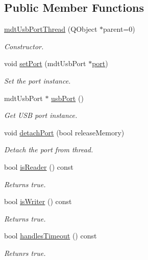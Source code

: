 \subsection*{Public Member Functions}
\begin{DoxyCompactItemize}
\item 
\hyperlink{classmdt_usb_port_thread_aaf4e5883224f05d80132b31a921ac899}{mdt\-Usb\-Port\-Thread} (Q\-Object $\ast$parent=0)
\begin{DoxyCompactList}\small\item\em Constructor. \end{DoxyCompactList}\item 
void \hyperlink{classmdt_usb_port_thread_a1661f362e2d772c1524f09daa6da3f15}{set\-Port} (mdt\-Usb\-Port $\ast$\hyperlink{classmdt_port_thread_a97bff8cf6aca37d8858cc4e5c9294cae}{port})
\begin{DoxyCompactList}\small\item\em Set the port instance. \end{DoxyCompactList}\item 
mdt\-Usb\-Port $\ast$ \hyperlink{classmdt_usb_port_thread_aaa8e1ce181489dbae57c81b42dc6ad62}{usb\-Port} ()
\begin{DoxyCompactList}\small\item\em Get U\-S\-B port instance. \end{DoxyCompactList}\item 
void \hyperlink{classmdt_usb_port_thread_a99070e7dba4bd7939b054cddbd66979f}{detach\-Port} (bool release\-Memory)
\begin{DoxyCompactList}\small\item\em Detach the port from thread. \end{DoxyCompactList}\item 
bool \hyperlink{classmdt_usb_port_thread_aed82b57c84745f1e2391750697db1022}{is\-Reader} () const 
\begin{DoxyCompactList}\small\item\em Returns true. \end{DoxyCompactList}\item 
bool \hyperlink{classmdt_usb_port_thread_a74258f300967b5dea1fbfa9a0ccab38a}{is\-Writer} () const 
\begin{DoxyCompactList}\small\item\em Returns true. \end{DoxyCompactList}\item 
bool \hyperlink{classmdt_usb_port_thread_aeaa2dabc53e57f6b7cf7077d113c7f40}{handles\-Timeout} () const 
\begin{DoxyCompactList}\small\item\em Retunrs true. \end{DoxyCompactList}\end{DoxyCompactItemize}
